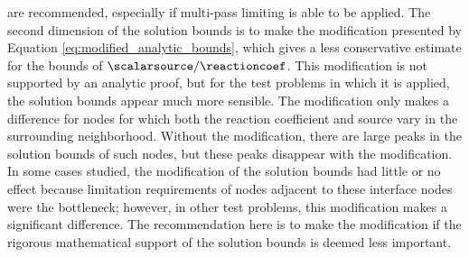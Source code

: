 are recommended, especially if multi-pass limiting is able to be applied.
The second dimension of the solution bounds is to make the modification
presented by Equation \eqref{eq:modified_analytic_bounds}, which
gives a less conservative estimate for the bounds of $\scalarsource/\reactioncoef$.
This modification is not supported by an analytic proof, but for the
test problems in which it is applied, the solution bounds appear much
more sensible. The modification only makes a difference for nodes for
which both the reaction coefficient and source vary in the surrounding
neighborhood. Without the modification, there are large peaks in the
solution bounds of such nodes, but these peaks disappear with the
modification. In some cases studied, the modification of the solution
bounds had little or no effect because limitation requirements of
nodes adjacent to these interface nodes were the bottleneck; however,
in other test problems, this modification makes a significant difference.
The recommendation here is to make the modification if the rigorous
mathematical support of the solution bounds is deemed less important.


